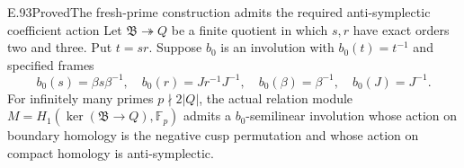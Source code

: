 \begin{result}{E.93}{Proved}{The fresh-prime construction admits the required anti-symplectic coefficient action}
Let \(\mathfrak B\twoheadrightarrow Q\) be a finite quotient
in which \(s,r\) have exact orders two and three.  Put \(t=sr\).
Suppose \(b_0\) is an involution with \(b_0(t)=t^{-1}\) and
specified frames
\[
 b_0(s)=\beta s\beta^{-1},\quad b_0(r)=Jr^{-1}J^{-1},
 \quad b_0(\beta)=\beta^{-1},\quad b_0(J)=J^{-1}.
                                                        \tag{E.93.1}
\]
For infinitely many primes \(p\nmid2|Q|\), the actual relation
module \(M=H_1(\ker(\mathfrak B\to Q),\mathbb F_p)\) admits
a \(b_0\)-semilinear involution whose action on boundary homology
is the negative cusp permutation and whose action on compact
homology is anti-symplectic.
\end{result}
